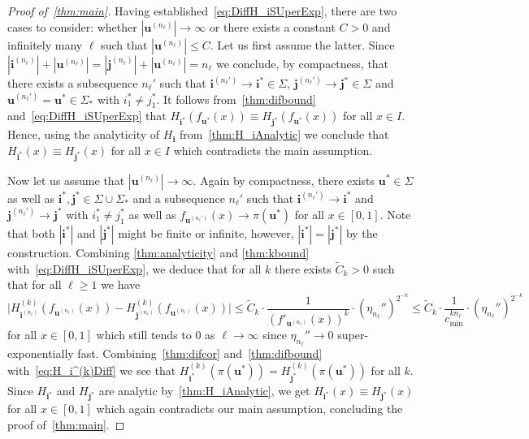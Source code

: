 \documentclass[11pt,]{article}
\def\cref#1{\ref{#1}}%
\theoremstyle{definition}
\theoremstyle{remark}
\newcommand{\0}{\mathbf{0}}
\newcommand{\bi}{\mathbf{i}}
\newcommand{\bj}{\mathbf{j}}
\newcommand{\bu}{\mathbf{u}}
\begin{document}
\begin{proof}[Proof of~\cref{thm:main}]
Having established~\cref{eq:DiffH_iSUperExp}, there are two cases to consider: whether
$|\bu^{(n_\ell)}| \to \infty$ or there exists a constant $C>0$ and infinitely many $\ell$ such that
$|\bu^{(n_\ell)}| \leq C$. Let us first assume the latter. Since $|\bi^{(n_\ell)}|+ |\bu^{(n_\ell)}|
= |\bj^{(n_\ell)}|+|\bu^{(n_\ell)}| = n_\ell$ we conclude, by compactness, that
there exists a subsequence $n_\ell'$ such that $\bi^{(n_\ell')} \to \bi^*\in\Sigma$,
$\bj^{(n_\ell')}\to\bj^*\in\Sigma$ and $\bu^{(n_\ell')}=\bu^*\in\Sigma_*$ with $i_1^*\neq j_1^*$.
It follows from~\cref{thm:difbound} and~\cref{eq:DiffH_iSUperExp} that
$
  H_{\bi^*}(f_{\bu^*}(x))\equiv H_{\bj^*}(f_{\bu^*}(x))
$
for all $x\in I$.  Hence, using the analyticity of $H_{\bi}$ from~\cref{thm:H_iAnalytic} we conclude
that $H_{\bi^*}(x) \equiv H_{\bj^*}(x)$ for all $x\in I$ which contradicts the main assumption.

Now let us assume that $|\bu^{(n_\ell)}| \to \infty$. Again by compactness, there exists
$\bu^*\in\Sigma$ as well as $\bi^*,\bj^*\in\Sigma\cup\Sigma_*$  and a
subsequence $n_\ell'$ such that $\bi^{(n_\ell')}\to \bi^*$ and $\bj^{(n_\ell')}\to \bj^*$ with
$i_1^*\neq j_1^*$ as well as $f_{\bu^{(n_\ell')}}(x) \to \pi(\bu^*)$ for all $x\in[0,1]$. Note that
both $|\bi^*|$ and
$|\bj^*|$ might be finite or infinite, however, $|\bi^*|=|\bj^*|$ by the construction. Combining
\cref{thm:analyticity} and \cref{thm:kbound} with~\cref{eq:DiffH_iSUperExp}, we deduce that for all
$k$ there
exists $\widetilde{C}_k>0$ such that for all $\ell\geq 1$ we have
\begin{equation}\label{eq:H_i^(k)Diff}
  \big|H_{\bi^{(n_\ell)}}^{(k)}(f_{\bu^{(n_\ell)}}(x)) - H_{\bj^{(n_\ell)}}^{(k)}(f_{\bu^{(n_\ell)}}(x))\big|
  \leq \widetilde{C}_k \cdot
  \frac{1}{(f'_{\bu^{(n_\ell)}}(x))^k}\cdot\left(\eta_{n_\ell}''\right)^{2^{-k}}\leq\widetilde{C}_k
  \cdot \frac{1}{c_{\min}^{k n_\ell}}\cdot\left(\eta_{n_\ell}''\right)^{2^{-k}}
\end{equation}
for all $x\in[0,1]$ which still tends to $0$ as $\ell\to\infty$ since $\eta_{n_{\ell}}''\to 0$
super-exponentially fast. Combining~\cref{thm:difcor} and~\cref{thm:difbound}
with~\cref{eq:H_i^(k)Diff} we see that $H_{\bi^*}^{(k)}(\pi(\bu^*))=H_{\bj^*}^{(k)}(\pi(\bu^*))$ for
all $k$.
Since $H_{\bi^*}$ and $H_{\bj^*}$ are analytic by~\cref{thm:H_iAnalytic}, we get 
$H_{\bi^*}(x)\equiv H_{\bj^*}(x)$ for all
$x\in[0,1]$ which again contradicts our main assumption, concluding the proof of~\cref{thm:main}. 
\end{proof}
\end{document}
